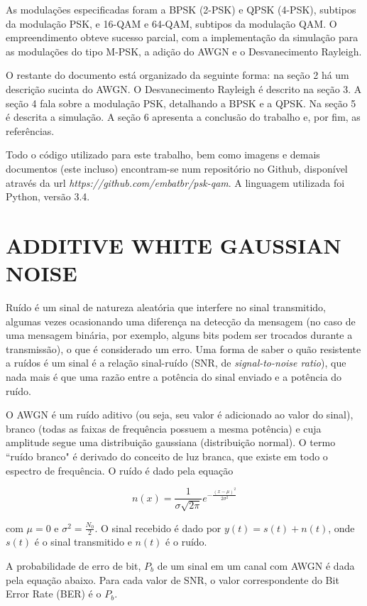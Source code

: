 \documentclass[a4paper,twocolumn]{article}
\begin{document}
As modulações especificadas foram a BPSK (2-PSK) e QPSK (4-PSK), subtipos da modulação PSK, e 16-QAM e 64-QAM, subtipos da modulação QAM. O empreendimento obteve sucesso parcial, com a implementação da simulação para as modulações do tipo M-PSK, a adição do AWGN e o Desvanecimento Rayleigh.

O restante do documento está organizado da seguinte forma: na seção 2 há um descrição sucinta do AWGN. O Desvanecimento Rayleigh é descrito na seção 3. A seção 4 fala sobre a modulação PSK, detalhando a BPSK e a QPSK. Na seção 5 é descrita a simulação. A seção 6 apresenta a conclusão do trabalho e, por fim, as referências.

Todo o código utilizado para este trabalho, bem como imagens e demais documentos (este incluso) encontram-se num repositório no Github, disponível através da url \textit{https://github.com/embatbr/psk-qam}. A linguagem utilizada foi Python, versão 3.4.


\section{ADDITIVE WHITE GAUSSIAN NOISE}

Ruído é um sinal de natureza aleatória que interfere no sinal transmitido, algumas vezes ocasionando uma diferença na detecção da mensagem (no caso de uma mensagem binária, por exemplo, alguns bits podem ser trocados durante a transmissão), o que é considerado um erro. Uma forma de saber o quão resistente a ruídos é um sinal é a relação sinal-ruído (SNR, de \textit{signal-to-noise ratio}), que nada mais é que uma razão entre a potência do sinal enviado e a potência do ruído.

O AWGN é um ruído aditivo (ou seja, seu valor é adicionado ao valor do sinal), branco (todas as faixas de frequência possuem a mesma potência) e cuja amplitude segue uma distribuição gaussiana (distribuição normal). O termo ``ruído branco" é derivado do conceito de luz branca, que existe em todo o espectro de frequência. O ruído é dado pela equação

\begin{equation}
    n(x) = \frac{1}{\sigma \sqrt{2\pi}} e^{- \frac{(x - \mu)^2}{2\sigma^2}}
\end{equation}

\noindent com $\mu = 0$ e $\sigma^2 = \frac{N_0}{2}$. O sinal recebido é dado por $y(t) = s(t) + n(t)$, onde $s(t)$ é o sinal transmitido e $n(t)$ é o ruído.

A probabilidade de erro de bit, $P_b$ de um sinal em um canal com AWGN é dada pela equação abaixo. Para cada valor de SNR, o valor correspondente do Bit Error Rate (BER) é o $P_b$.
\end{document}
